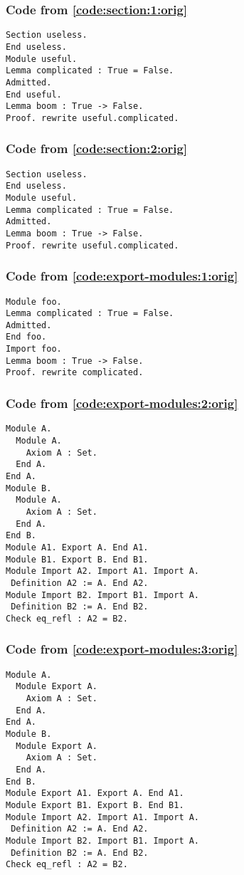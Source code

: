 \documentclass[a4paper,USenglish,cleveref,autoref,thm-restate]{lipics-v2021}
\begin{document}
\subsubsection{Code from \autoref{code:section:1:orig}}\label{code:section:1}
\begin{verbatim}
Section useless.
End useless.
Module useful.
Lemma complicated : True = False.
Admitted.
End useful.
Lemma boom : True -> False.
Proof. rewrite useful.complicated.
\end{verbatim}

\subsubsection{Code from \autoref{code:section:2:orig}}\label{code:section:2}
\begin{verbatim}
Section useless.
End useless.
Module useful.
Lemma complicated : True = False.
Admitted.
Lemma boom : True -> False.
Proof. rewrite useful.complicated.
\end{verbatim}

\subsubsection{Code from \autoref{code:export-modules:1:orig}}\label{code:export-modules:1}
\begin{verbatim}
Module foo.
Lemma complicated : True = False.
Admitted.
End foo.
Import foo.
Lemma boom : True -> False.
Proof. rewrite complicated.
\end{verbatim}

\subsubsection{Code from \autoref{code:export-modules:2:orig}}\label{code:export-modules:2}
\begin{verbatim}
Module A.
  Module A.
    Axiom A : Set.
  End A.
End A.
Module B.
  Module A.
    Axiom A : Set.
  End A.
End B.
Module A1. Export A. End A1.
Module B1. Export B. End B1.
Module Import A2. Import A1. Import A.
 Definition A2 := A. End A2.
Module Import B2. Import B1. Import A.
 Definition B2 := A. End B2.
Check eq_refl : A2 = B2.
\end{verbatim}

\subsubsection{Code from \autoref{code:export-modules:3:orig}}\label{code:export-modules:3}
\begin{verbatim}
Module A.
  Module Export A.
    Axiom A : Set.
  End A.
End A.
Module B.
  Module Export A.
    Axiom A : Set.
  End A.
End B.
Module Export A1. Export A. End A1.
Module Export B1. Export B. End B1.
Module Import A2. Import A1. Import A.
 Definition A2 := A. End A2.
Module Import B2. Import B1. Import A.
 Definition B2 := A. End B2.
Check eq_refl : A2 = B2.
\end{verbatim}
\end{document}
